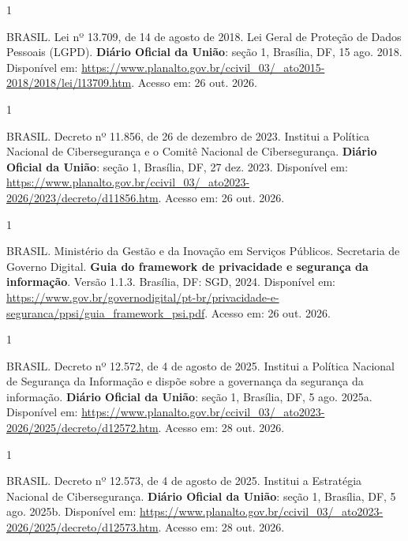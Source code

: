 \documentclass[12pt,a4paper]{article}
\begin{document}
\begin{spacing}{1}\raggedright\noindent BRASIL. Lei nº 13.709, de 14 de agosto de 2018. Lei Geral de Proteção de Dados Pessoais (LGPD). \textbf{Diário Oficial da União}: seção 1, Brasília, DF, 15 ago. 2018. Disponível em: \url{https://www.planalto.gov.br/ccivil_03/_ato2015-2018/2018/lei/l13709.htm}. Acesso em: 26 out. 2026.\par\vspace{12pt}\end{spacing}
\begin{spacing}{1}\raggedright\noindent BRASIL. Decreto nº 11.856, de 26 de dezembro de 2023. Institui a Política Nacional de Cibersegurança e o Comitê Nacional de Cibersegurança. \textbf{Diário Oficial da União}: seção 1, Brasília, DF, 27 dez. 2023. Disponível em: \url{https://www.planalto.gov.br/ccivil_03/_ato2023-2026/2023/decreto/d11856.htm}. Acesso em: 26 out. 2026.\par\vspace{12pt}\end{spacing}
\begin{spacing}{1}\raggedright\noindent BRASIL. Ministério da Gestão e da Inovação em Serviços Públicos. Secretaria de Governo Digital. \textbf{Guia do framework de privacidade e segurança da informação}. Versão 1.1.3. Brasília, DF: SGD, 2024. Disponível em: \url{https://www.gov.br/governodigital/pt-br/privacidade-e-seguranca/ppsi/guia_framework_psi.pdf}. Acesso em: 26 out. 2026.\par\vspace{12pt}\end{spacing}
\begin{spacing}{1}\raggedright\noindent BRASIL. Decreto nº 12.572, de 4 de agosto de 2025. Institui a Política Nacional de Segurança da Informação e dispõe sobre a governança da segurança da informação. \textbf{Diário Oficial da União}: seção 1, Brasília, DF, 5 ago. 2025a. Disponível em: \url{https://www.planalto.gov.br/ccivil_03/_ato2023-2026/2025/decreto/d12572.htm}. Acesso em: 28 out. 2026.\par\vspace{12pt}\end{spacing}
\begin{spacing}{1}\raggedright\noindent BRASIL. Decreto nº 12.573, de 4 de agosto de 2025. Institui a Estratégia Nacional de Cibersegurança. \textbf{Diário Oficial da União}: seção 1, Brasília, DF, 5 ago. 2025b. Disponível em: \url{https://www.planalto.gov.br/ccivil_03/_ato2023-2026/2025/decreto/d12573.htm}. Acesso em: 28 out. 2026.\par\vspace{12pt}\end{spacing}
\end{document}
